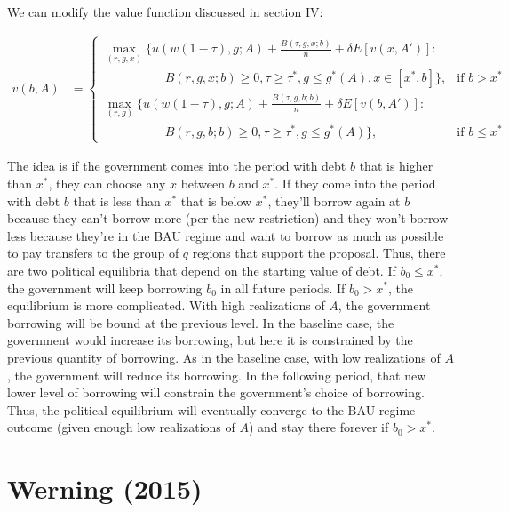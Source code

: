 \documentclass{article}
\begin{document}
\begin{enumerate}
We can modify the value function discussed in section IV:

\begin{align*}
v(b, A) 
&=
\begin{cases}
\max_{(r, g, x)} \Big \{ 
u(w(1-\tau), g; A) + \frac{B(\tau, g, x; b)}{n} + \delta E[v(x, A')]: &\\
\;\;\;\;\;\;
\;\;\;\;\;\;
\;\;\;\;\;\;
B(r, g, x; b) \ge 0, 
\tau \ge \tau^*,
g \le g^*(A),
x \in [x^*, b]
\Big \}, &
\text{if } b > x^*\\
\max_{(r, g)} \Big \{ 
u(w(1-\tau), g; A) + \frac{B(\tau, g, b; b)}{n} + \delta E[v(b, A')]:&\\
\;\;\;\;\;\;
\;\;\;\;\;\;
\;\;\;\;\;\;
B(r, g, b; b) \ge 0, 
\tau \ge \tau^*,
g \le g^*(A)
\Big \}, &
\text{if } b \le x^*
\end{cases}
\end{align*}

The idea is if the government comes into the period with debt $b$ that is higher than $x^*$, they can choose any $x$ between $b$ and $x^*$.  If they come into the period with debt $b$ that is less than $x^*$ that is below $x^*$, they'll borrow again at $b$ because they can't borrow more (per the new restriction) and they won't borrow less because they're in the BAU regime and want to borrow as much as possible to pay transfers to the group of $q$ regions that support the proposal.  Thus, there are two political equilibria that depend on the starting value of debt.  If $b_0 \le x^*$, the government will keep borrowing $b_0$ in all future periods.  If $b_0 > x^*$, the equilibrium is more complicated.  With high realizations of $A$, the government borrowing will be bound at the previous level. In the baseline case, the government would increase its borrowing, but here it is constrained by the previous quantity of borrowing.  As in the baseline case, with low realizations of $A$, the government will reduce its borrowing.  In the following period, that new lower level of borrowing will constrain the government's choice of borrowing.  Thus, the political equilibrium will eventually converge to the BAU regime outcome (given enough low realizations of $A$) and stay there forever if $b_0 > x^*$.

\end{enumerate}

\pagebreak

\section{Werning (2015)}
\end{document}
